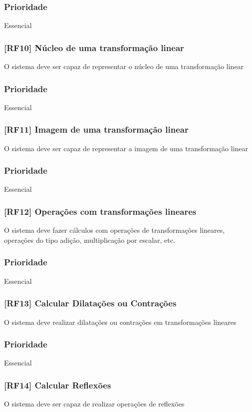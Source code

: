 \documentclass{scrreprt}
\begin{document}
\subsubsection{Prioridade}
Essencial

\subsubsection{[RF10] Núcleo de uma transformação linear }
O sistema deve ser capaz de representar o núcleo de uma transformação linear
\subsubsection{Prioridade}
Essencial

\subsubsection{[RF11] Imagem de uma transformação linear }
O sistema deve ser capaz de representar a imagem de uma transformação linear
\subsubsection{Prioridade}
Essencial

\subsubsection{[RF12]  Operações com transformações lineares}
O sistema deve fazer cálculos com operações de transformações lineares, operações do tipo adição, multiplicação por escalar, etc.
\subsubsection{Prioridade}
Essencial

\subsubsection{[RF13] Calcular Dilatações ou Contrações }
O sistema deve realizar dilatações ou contrações em transformações lineares
\subsubsection{Prioridade}
Essencial

\subsubsection{[RF14] Calcular Reflexões}
O sistema deve ser capaz de realizar operações de reflexões
\end{document}

